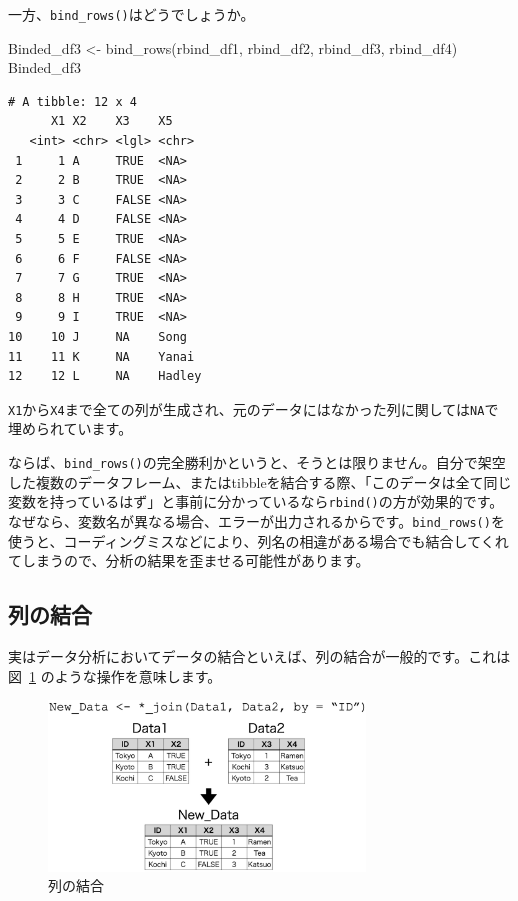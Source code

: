 \documentclass[
  a4paper,
  pandoc,
  ja=standard,
  jafont=haranoaji]{bxjsbook}
\newenvironment{Shaded}{\begin{snugshade}}{\end{snugshade}}
\newcommand{\FunctionTok}[1]{\textcolor[rgb]{0.28,0.35,0.67}{#1}}
\newcommand{\NormalTok}[1]{\textcolor[rgb]{0.00,0.48,0.65}{#1}}
\newcommand{\OtherTok}[1]{\textcolor[rgb]{0.00,0.48,0.65}{#1}}
\begin{document}
一方、\texttt{bind\_rows()}はどうでしょうか。

\begin{Shaded}
\begin{Highlighting}[numbers=left,,]
\NormalTok{Binded\_df3 }\OtherTok{\textless{}{-}} \FunctionTok{bind\_rows}\NormalTok{(rbind\_df1, rbind\_df2, rbind\_df3, rbind\_df4)}
\NormalTok{Binded\_df3}
\end{Highlighting}
\end{Shaded}

\begin{verbatim}
# A tibble: 12 x 4
      X1 X2    X3    X5    
   <int> <chr> <lgl> <chr> 
 1     1 A     TRUE  <NA>  
 2     2 B     TRUE  <NA>  
 3     3 C     FALSE <NA>  
 4     4 D     FALSE <NA>  
 5     5 E     TRUE  <NA>  
 6     6 F     FALSE <NA>  
 7     7 G     TRUE  <NA>  
 8     8 H     TRUE  <NA>  
 9     9 I     TRUE  <NA>  
10    10 J     NA    Song  
11    11 K     NA    Yanai 
12    12 L     NA    Hadley
\end{verbatim}

\texttt{X1}から\texttt{X4}まで全ての列が生成され、元のデータにはなかった列に関しては\texttt{NA}で埋められています。

ならば、\texttt{bind\_rows()}の完全勝利かというと、そうとは限りません。自分で架空した複数のデータフレーム、またはtibbleを結合する際、「このデータは全て同じ変数を持っているはず」と事前に分かっているなら\texttt{rbind()}の方が効果的です。なぜなら、変数名が異なる場合、エラーが出力されるからです。\texttt{bind\_rows()}を使うと、コーディングミスなどにより、列名の相違がある場合でも結合してくれてしまうので、分析の結果を歪ませる可能性があります。

\hypertarget{ux5217ux306eux7d50ux5408}{%
\subsection{列の結合}\label{ux5217ux306eux7d50ux5408}}

実はデータ分析においてデータの結合といえば、列の結合が一般的です。これは
図~\ref{fig-handling2_merge_col} のような操作を意味します。

\begin{figure}

{\centering \includegraphics[width=0.75\textwidth,height=\textheight]{./Figs/Handling2/Merge2.png}

}

\caption{\label{fig-handling2_merge_col}列の結合}

\end{figure}
\end{document}
